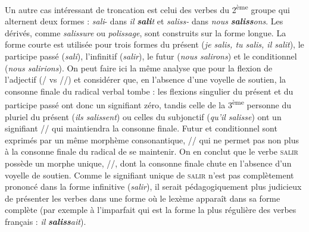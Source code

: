 {    
    Un autre cas intéressant de troncation est celui des verbes du 2\textsuperscript{ème} groupe qui alternent deux formes : \textit{sali}{}- dans \textit{il} \textbf{\textit{sali}}\textit{t} et \textit{saliss-} dans \textit{nous} \textbf{\textit{saliss}}\textit{ons}. Les dérivés, comme \textit{salissure} ou \textit{polissage}, sont construits sur la forme longue. La forme courte est utilisée pour trois formes du présent (\textit{je salis, tu salis, il salit}), le participe passé (\textit{sali}), l’infinitif (\textit{salir}), le futur (\textit{nous salirons}) et le conditionnel (\textit{nous salirions}). On peut faire ici la même analyse que pour la flexion de l’adjectif (/ vs //) et considérer que, en l’absence d’une voyelle de soutien, la consonne finale du radical verbal tombe : les flexions singulier du présent et du participe passé ont donc un signifiant zéro, tandis celle de la 3\textsuperscript{ème} personne du pluriel du présent (\textit{ils salissent}) ou celles du subjonctif (\textit{qu’il salisse}) ont un signifiant \textstylePhonoApprofondissement{{}-}// qui maintiendra la consonne finale. Futur et conditionnel sont exprimés par un même morphème consonantique, \textstylePhonoApprofondissement{{}-}//\textstylePhonoApprofondissement{{}-} qui ne permet pas non plus à la consonne finale du radical de se maintenir. On en conclut que le verbe \textsc{salir} possède un morphe unique, //, dont la consonne finale chute en l’absence d’un voyelle de soutien. Comme le signifiant unique de \textsc{salir} n’est pas complètement prononcé dans la forme infinitive (\textit{salir}), il serait pédagogiquement plus judicieux de présenter les verbes dans une forme où le lexème apparaît dans sa forme complète (par exemple à l’imparfait qui est la forme la plus régulière des verbes français : \textit{il} \textbf{\textit{saliss}}\textit{ait}).

}
